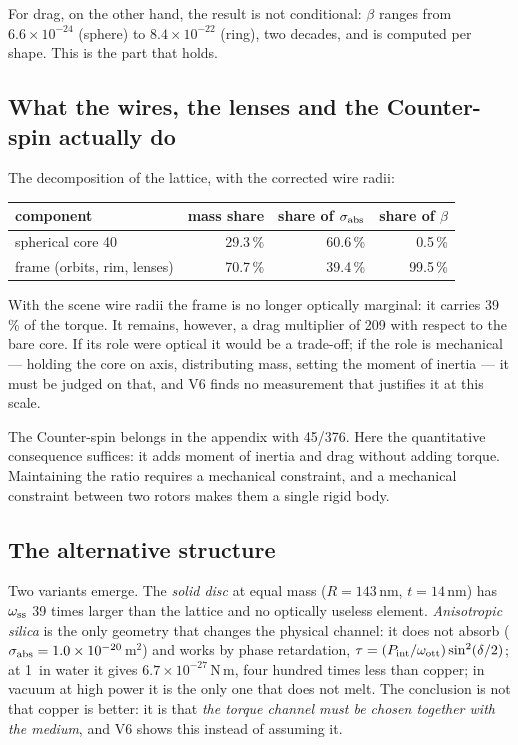 \documentclass[11pt,a4paper]{article}
\providecommand{\toprule}{\hline}
\providecommand{\midrule}{\hline}
\providecommand{\bottomrule}{\hline}
\providecommand{\micro}{\textmu}
\providecommand{\SI}[2]{#1\,\text{#2}}
\begin{document}
For drag, on the other hand, the result is not conditional: $\beta$ ranges from
$6.6\times10^{-24}$ (sphere) to $8.4\times10^{-22}$ (ring), two decades, and is
computed per shape. This is the part that holds.

\subsection{What the wires, the lenses and the Counter-spin actually do}

The decomposition of the lattice, with the corrected wire radii:
\begin{center}\small
\begin{tabular}{lrrr}
\toprule
component & mass share & share of $\sigma_{\rm abs}$ & share of $\beta$ \\
\midrule
spherical core \SI{40}{nm} & 29.3\,\% & 60.6\,\% & 0.5\,\% \\
frame (orbits, rim, lenses) & 70.7\,\% & 39.4\,\% & 99.5\,\% \\
\bottomrule
\end{tabular}
\end{center}
With the scene wire radii the frame is no longer optically marginal: it carries 39\,\%
of the torque. It remains, however, a drag multiplier of 209 with respect to the bare
core. If its role were optical it would be a trade-off; if the role is mechanical ---
holding the core on axis, distributing mass, setting the moment of inertia --- it must
be judged on that, and V6 finds no measurement that justifies it at this scale.

The Counter-spin belongs in the appendix with 45/376. Here the quantitative consequence
suffices: it adds moment of inertia and drag without adding torque. Maintaining the
ratio requires a mechanical constraint, and a mechanical constraint between two rotors
makes them a single rigid body.

\subsection{The alternative structure}

Two variants emerge. The \emph{solid disc} at equal mass ($R=\SI{143}{nm}$,
$t=\SI{14}{nm}$) has $\omega_{\rm ss}$ 39 times larger than the lattice and no
optically useless element. \emph{Anisotropic silica} is the only geometry that changes
the physical channel: it does not absorb ($\sigma_{\rm abs}=1.0\times10^{-20}$\,m$^2$)
and works by phase retardation, $\tau=(P_{\rm int}/\omega_{\rm ott})\sin^2(\delta/2)$;
at \SI{1}{\micro W} in water it gives $6.7\times10^{-27}$\,N\,m, four hundred times
less than copper; in vacuum at high power it is the only one that does not melt. The
conclusion is not that copper is better: it is that \emph{the torque channel must be
chosen together with the medium}, and V6 shows this instead of assuming it.
\end{document}

